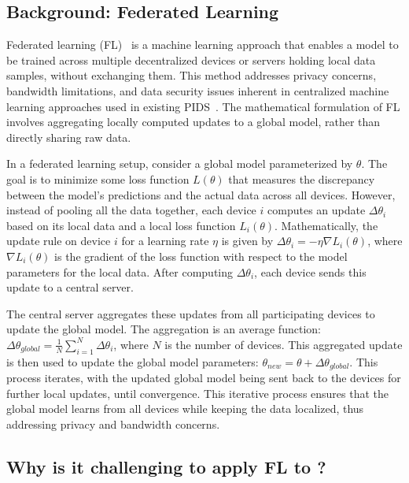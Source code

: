 \subsection{Background: Federated Learning}

Federated learning (FL)~\cite{mcmahan2017communication} is a machine learning approach that enables a model to be trained across multiple decentralized devices or servers holding local data samples, without exchanging them. This method addresses privacy concerns, bandwidth limitations, and data security issues inherent in centralized machine learning approaches used in existing PIDS~\cite{flash2024,cheng2023kairos,wang2022threatrace}. The mathematical formulation of FL involves aggregating locally computed updates to a global model, rather than directly sharing raw data.

In a federated learning setup, consider a global model parameterized by \(\theta\). The goal is to minimize some loss function \(L(\theta)\) that measures the discrepancy between the model's predictions and the actual data across all devices. However, instead of pooling all the data together, each device \(i\) computes an update \(\Delta \theta_i\) based on its local data and a local loss function \(L_i(\theta)\). Mathematically, the update rule on device \(i\) for a learning rate \(\eta\) is given by \(\Delta \theta_i = -\eta \nabla L_i(\theta)\), where \(\nabla L_i(\theta)\) is the gradient of the loss function with respect to the model parameters for the local data. After computing \(\Delta \theta_i\), each device sends this update to a central server.

The central server aggregates these updates from all participating devices to update the global model. The aggregation is an average function: \(\Delta \theta_{global} = \frac{1}{N} \sum_{i=1}^{N} \Delta \theta_i\), where \(N\) is the number of devices. This aggregated update is then used to update the global model parameters: \(\theta_{new} = \theta + \Delta \theta_{global}\). This process iterates, with the updated global model being sent back to the devices for further local updates, until convergence. This iterative process ensures that the global model learns from all devices while keeping the data localized, thus addressing privacy and bandwidth concerns.


\subsection{Why is it challenging to apply FL to \pids?}

